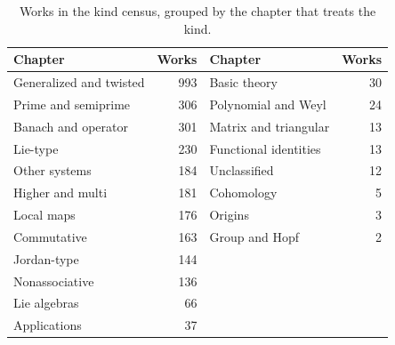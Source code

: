 \begin{table}[htbp]
  \centering
  \caption{Works in the kind census, grouped by the chapter that treats the
  kind.} %
  \label{tab:atlas:kinds-chapters}
  \begin{tabular}{lr@{\qquad}lr}
    \toprule
    Chapter & Works & Chapter & Works \\ %
    \midrule
    Generalized and twisted & 993 & Basic theory          & 30 \\ %
    Prime and semiprime     & 306 & Polynomial and Weyl   & 24 \\ %
    Banach and operator     & 301 & Matrix and triangular & 13 \\ %
    Lie-type                & 230 & Functional identities & 13 \\ %
    Other systems           & 184 & Unclassified          & 12 \\ %
    Higher and multi        & 181 & Cohomology            & 5  \\ %
    Local maps              & 176 & Origins               & 3  \\ %
    Commutative             & 163 & Group and Hopf        & 2  \\ %
    Jordan-type             & 144 &                       &    \\ %
    Nonassociative          & 136 &                       &    \\ %
    Lie algebras            & 66  &                       &    \\ %
    Applications            & 37  &                       &    \\ %
    \bottomrule
  \end{tabular}
\end{table}

